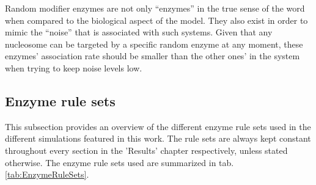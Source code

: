                 Random modifier enzymes are not only “enzymes” in the true sense of the word when compared to the biological aspect of the model. They also exist in order to mimic the “noise” that is associated with such systems. Given that any nucleosome can be targeted by a specific random enzyme at any moment, these enzymes' association rate should be smaller than the other ones' in the system when trying to keep noise levels low.
        \subsection{Enzyme rule sets}
            This subsection provides an overview of the different enzyme rule sets used in the different simulations featured in this work. The rule sets are always kept constant throughout every section in the 'Results' chapter respectively, unless stated otherwise. The enzyme rule sets used are summarized in tab. \ref{tab:EnzymeRuleSets}.

